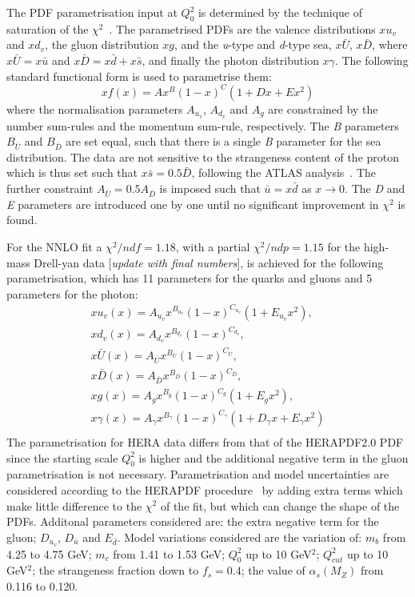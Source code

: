 The PDF parametrisation input at $Q^2_0$ is determined by the technique of saturation of the $\chi^{2}$~\cite{h1chisqsat}.
The parametrised PDFs are the valence distributions $xu_{v}$ and $xd_{v}$, the gluon distribution $xg$, and the \textit{u}-type and \textit{d}-type sea, $x\bar{U}$, $x\bar{D}$, where $x\bar{U} = x\bar{u}$ and $x\bar{D} = x\bar{d} + x\bar{s}$, and finally the photon distribution $x\gamma$. The following standard functional form is used to parametrise them:
\begin{equation}
xf(x) = Ax^{B}(1-x)^{C}(1+Dx+Ex^{2})
\end{equation}
where the normalisation parameters $A_{u_{v}}$, $A_{d_{v}}$ and $A_{g}$ are constrained by the number sum-rules and the 
momentum sum-rule, respectively. The \textit{B} parameters $B_{\bar{U}}$ and $B_{\bar{D}}$ are set equal, such that there 
is a single \textit{B} parameter for the sea distribution. The data are not sensitive to the 
strangeness content of the proton which is thus set such that $x\bar{s} = 0.5\bar{D}$, following the ATLAS 
analysis~\cite{atlasstrange}. The further constraint $A_{\bar{U}} = 0.5 A_{\bar{D}}$ is imposed such that $\bar{u}=x\bar{d}$ as $x \to 0$.
The \textit{D} and \textit{E} parameters are introduced one by one until no significant 
improvement in $\chi^{2}$ is found. 

 For the NNLO fit a $\chi^{2}/ndf = 1.18$, with a partial $\chi^2/ndp = 1.15$ for the high-mass Drell-yan data [{\it update with final numbers}], is achieved for the following parametrisation, which has 11 parameters for the quarks and gluons and 5 parameters for the photon:
\begin{eqnarray}
xu_v(x) = A_{u_v}x^{B_{u_v}}(1-x)^{C_{u_v}}(1+E_{u_v}x^{2}), \\
xd_v(x) = A_{d_v}x^{B_{d_v}}(1-x)^{C_{d_v}}, \\
x\bar{U}(x) = A_{\bar{U}}x^{B_{\bar{U}}}(1-x)^{C_{\bar{U}}}, \\
x\bar{D}(x) = A_{\bar{D}}x^{B_{\bar{D}}}(1-x)^{C_{\bar{D}}}, \\
xg(x) = A_{g}x^{B_{g}}(1-x)^{C_{g}}(1+E_{g}x^{2}), \\
x\gamma(x) = A_{\gamma}x^{B_{\gamma}}(1-x)^{C_{\gamma}}(1+D_{\gamma}x+E_{\gamma}x^{2}) \\
\end{eqnarray}
The parametrisation for HERA data differs from that of the HERAPDF2.0 PDF since the starting scale $Q^2_0$ is higher and the additional negative term in the gluon parametrisation is not necessary.
Parametrisation and model uncertainties are considered according to the HERAPDF 
procedure~\cite{hera} 
by adding extra terms which make little difference to the $\chi^2$ of the fit, but which can change the shape of the PDFs. Additonal parameters considered are: the extra negative term for the gluon; $D_{u_v}$, $D_{\bar{u}}$ and $E_{\bar{d}}$. Model variations considered are the variation of: 
$m_b$ from 4.25 to 4.75 GeV; $m_c$ from 1.41 to 1.53 GeV;  $Q_0^2$ up to 10 GeV$^2$; 
$Q_{cut}^2$ up to 10 GeV$^2$; the strangeness fraction down to $f_s=0.4$; the value of $\alpha_s(M_Z)$ from 0.116 to 0.120.

